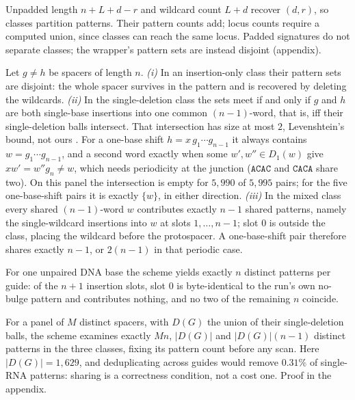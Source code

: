 \begin{remark}\label{rem:inv}
Unpadded length $n+L+d-r$ and wildcard count $L+d$ recover $(d,r)$, so classes
partition patterns. Their pattern counts add; locus counts require a computed
union, since classes can reach the same locus. Padded signatures do not separate
classes; the wrapper's pattern sets are instead disjoint (appendix).
\end{remark}

\begin{proposition}\label{prop:ident}
Let $g \neq h$ be spacers of length $n$.
\emph{(i)} In an insertion-only class their pattern sets are disjoint: the whole spacer
survives in the pattern and is recovered by deleting the wildcards.
\emph{(ii)} In the single-deletion class the sets meet if and only if $g$ and $h$ are both
single-base insertions into one common $(n-1)$-word, that is, iff their single-deletion balls
intersect. That intersection has size at most $2$, Levenshtein's bound, not ours
\citep{levenshtein2001reconstruction}. For a one-base shift $h = x\,g_1\cdots g_{n-1}$ it
always contains $w = g_1\cdots g_{n-1}$, and a second word exactly when some $w',w''\in D_1(w)$ give
$xw' = w''g_n\ne w$, which needs periodicity at the junction ($\texttt{ACAC}$ and $\texttt{CACA}$ share
two). On this panel the intersection is empty for $5{,}990$ of $5{,}995$ pairs; for the five
one-base-shift pairs it is exactly $\{w\}$, in either direction.
\emph{(iii)} In the mixed class every shared $(n-1)$-word $w$ contributes exactly $n-1$ shared
patterns, namely the single-wildcard insertions into $w$ at slots $1,\ldots,n-1$; slot $0$ is
outside the class, placing the wildcard before the protospacer. A one-base-shift pair therefore shares exactly $n-1$, or $2(n-1)$ in that periodic case.
\end{proposition}

\begin{proposition}\label{prop:count}
For one unpaired DNA base the scheme yields exactly $n$ distinct patterns per guide: of the $n+1$
insertion slots, slot $0$ is byte-identical to the run's own no-bulge pattern and contributes nothing,
and no two of the remaining $n$ coincide.
\end{proposition}

\begin{proposition}\label{prop:panel}
For a panel of $M$ distinct spacers, with $D(G)$ the union of their single-deletion balls, the
scheme examines exactly $Mn$, $\lvert D(G)\rvert$ and $\lvert D(G)\rvert(n-1)$ distinct patterns
in the three classes, fixing its pattern count before any scan. Here $\lvert D(G)\rvert = 1{,}629$,
and deduplicating across guides would remove $0.31\%$ of single-RNA patterns: sharing is a correctness condition,
not a cost one. Proof in the appendix.
\end{proposition}

